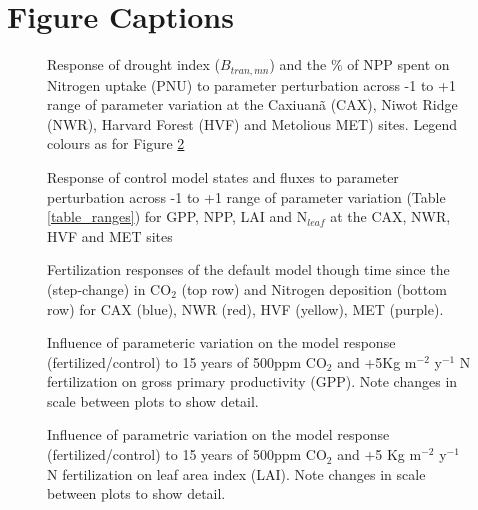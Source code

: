 \documentclass[draft,linenumbers]{agujournal}
\begin{document}
\section{Figure Captions}
\begin{figure}[h]
     \caption{Response of drought index ($B_{tran,mn}$) and the \% of NPP spent on Nitrogen uptake (PNU) to parameter perturbation across -1 to +1 range of parameter variation at the Caxiuan\~a (CAX), Niwot Ridge (NWR), Harvard Forest (HVF) and Metolious MET) sites. Legend colours as for Figure \ref{state}}
     \label{btran state}
 \end{figure}
 \begin{figure}[h]
     \caption{Response of control model states and fluxes to parameter perturbation across -1 to +1 range of parameter variation (Table \ref{table_ranges}) for GPP, NPP, LAI and N$_{leaf}$ at the CAX, NWR, HVF and MET sites}
     \label{state}
 \end{figure}
  \begin{figure}[h]
     \caption{Fertilization responses of the default model though time since the (step-change) in CO$_{2}$ (top row) and Nitrogen deposition (bottom row) for CAX (blue), NWR (red), HVF (yellow), MET (purple).}
     \label{timescales}
 \end{figure}
 \begin{figure}[h]
     \caption{Influence of parameteric variation on the model response (fertilized/control) to 15 years of 500ppm CO$_{2}$ and +5Kg m$^{-2}$ y$^{-1}$ N fertilization on gross primary productivity (GPP). Note changes in scale between plots to show detail.}
     \label{GPP_CN}
  \end{figure}
  \begin{figure}[h]
     \caption{Influence of parametric variation on the model response (fertilized/control) to 15 years of 500ppm CO$_{2}$ and +5 Kg m$^{-2}$ y$^{-1}$ N fertilization on leaf area index (LAI). Note changes in scale between plots to show detail.}
     \label{LAI_CN}
  \end{figure}
\end{document}

